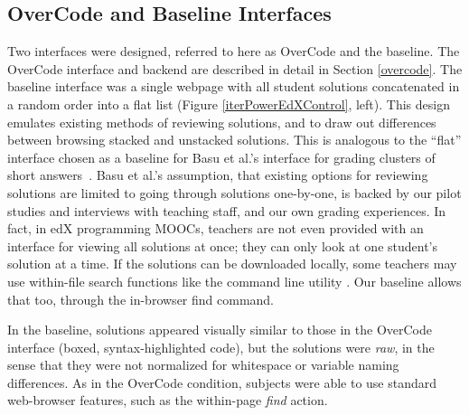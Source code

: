 \subsection{OverCode and Baseline Interfaces}

Two interfaces were designed, referred to here as OverCode and the baseline. The OverCode interface and backend are described in detail in Section \ref{overcode}. The baseline interface was a single webpage with all student solutions concatenated in a random order into a flat list (Figure \ref{iterPowerEdXControl}, left). This design emulates existing methods of reviewing solutions, and to draw out differences between browsing stacked and unstacked solutions. This is analogous to the ``flat'' interface chosen as a baseline for Basu et al.'s interface for grading clusters of short answers~\cite{basuDivideAndConquer}. Basu et al.'s assumption, that existing options for reviewing solutions are limited to going through solutions one-by-one, is backed by our pilot studies and interviews with teaching staff, and our own grading experiences. In fact, in edX programming MOOCs, teachers are not even provided with an interface for viewing all solutions at once; they can only look at one student's solution at a time. If the solutions can be downloaded locally, some teachers may use within-file search functions like the command line utility . Our baseline allows that too, through the in-browser find command. 

In the baseline, solutions appeared visually similar to those in the OverCode interface (boxed, syntax-highlighted code), but the solutions were \emph{raw}, in the sense that they were not normalized for whitespace or variable naming differences. As in the OverCode condition, subjects were able to use standard web-browser features, such as the within-page \emph{find} action.


